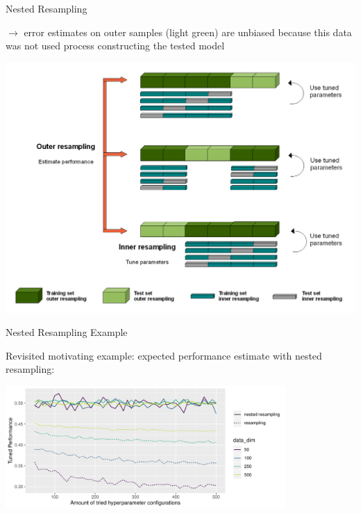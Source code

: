 \begin{frame}[c,allowframebreaks]{Nested Resampling}
    \framebreak

    \begin{footnotesize}
    $\rightarrow$ error estimates on outer samples (light green) are unbiased
    because this data was not used process constructing the tested model
    \end{footnotesize}

    \begin{center}
        \includegraphics[height=0.6\textheight]{images/Nested_Resampling}
    \end{center}

    \end{frame}


    \begin{frame}[c]{Nested Resampling Example}

    Revisited motivating example: expected performance estimate with nested
    resampling:

    \begin{center}
        \includegraphics[width=0.8\textwidth]{images/nested-resampling-example}
    \end{center}


    \end{frame}


